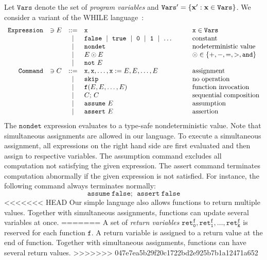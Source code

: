 
Let $\mathtt{Vars}$ denote the set of \emph{program variables} and
$\mathtt{Vars}' = \{ \textbf{x}' : \textbf{x} \in \mathtt{Vars} \}$.
We consider a variant of the WHILE language~\cite{}:
\begin{equation*}
  \begin{array}{rccll}
    \mathtt{Expression} & \ni E & ::= &
    \mathtt{x} & \mathtt{x} \in \mathtt{Vars}\\
    & & \mid &
    \mathtt{false}\ \mid\ \mathtt{true}\ \mid\ 
    \mathtt{0}\ \mid\ \mathtt{1}\ \mid\ \ldots\hspace{.06\textwidth} &
    \textmd{constant}\\
    & & \mid &
    \mathtt{nondet} & \textmd{nodeterministic value}\\
    & & \mid &
    E \odot E  & \odot \in \{ +, -, =, >, \mathtt{and} \}\\
    & & \mid & \mathtt{not}\ E\\
    \mathtt{Command} & \ni C & ::= &
    \mathtt{x}, \mathtt{x}, \ldots, \mathtt{x} := 
    E, E, \ldots, E & \textmd{assignment}\\
    & & \mid &
    \mathtt{skip} & \textmd{no operation}\\
    & & \mid &
    \mathtt{f}(E, E, \ldots, E) &
    \textmd{function invocation}\\
    & & \mid &
    C\mathtt{;}\ C &
    \textmd{sequential composition}\\
    & & \mid &
    \mathtt{assume}\ E & \textmd{assumption}\\
    & & \mid &
    \mathtt{assert}\ E & \textmd{assertion}
  \end{array}
\end{equation*}
The $\mathtt{nondet}$ expression evaluates to a type-safe
nondeterministic value.
Note that simultaneous assignments are allowed in our language. To
execute a simultaneous assignment, all expressions on the right hand
side are first evaluated and then assign to respective variables. 
The
assumption command excludes all computation not satisfying the given
expression. The assert command terminates computation
abnormally if the given expression is not satisfied. For
instance, the following command always terminates normally:
\begin{equation*}
  \mathtt{assume\ false};\ \ \mathtt{assert\ false}
\end{equation*}
<<<<<<< HEAD
Our simple language also allows functions to return multiple
values. Together with simultaneous assignments, functions can update
several variables at once.
=======
A set of \emph{return variables} $\mathtt{ret^f_0}, \mathtt{ret^f_1},
\ldots, \mathtt{ret^f_k}$ is reserved for each function $\mathtt{f}$. 
A return variable is assigned to a return value at the end of
function. Together with simultaneous assignments, functions can have
several return values.
>>>>>>> 047e7ea5b29f20c1722bd2e925b7b1a12471a652

